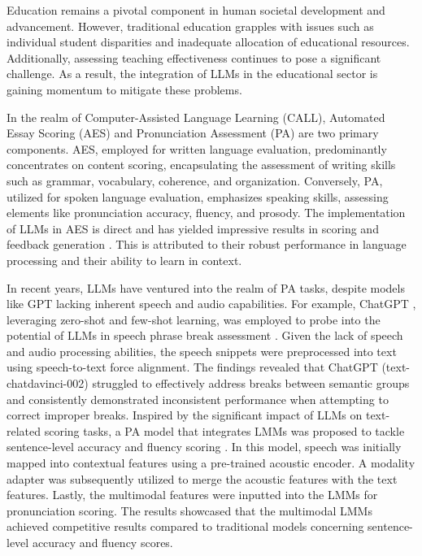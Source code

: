 \documentclass{Interspeech}
\begin{document}
Education remains a pivotal component in human societal development and advancement. However, traditional education grapples with issues such as individual student disparities and inadequate allocation of educational resources. Additionally, assessing teaching effectiveness continues to pose a significant challenge. As a result, the integration of LLMs in the educational sector \cite{gan2023llms} is gaining momentum to mitigate these problems.

In the realm of Computer-Assisted Language Learning (CALL), Automated Essay Scoring (AES) and Pronunciation Assessment (PA) are two primary components. AES, employed for written language evaluation, predominantly concentrates on content scoring, encapsulating the assessment of writing skills such as grammar, vocabulary, coherence, and organization. Conversely, PA, utilized for spoken language evaluation, emphasizes speaking skills, assessing elements like pronunciation accuracy, fluency, and prosody. The implementation of LLMs in AES is direct and has yielded impressive results in scoring and feedback generation \cite{han2023llm,xiao2024human,stahl2024exploring,banno2024gpt4,kim2024is}. This is attributed to their robust performance in language processing and their ability to learn in context.

In recent years, LLMs have ventured into the realm of PA tasks, despite models like GPT lacking inherent speech and audio capabilities. For example, ChatGPT \cite{openai2022chatgpt}, leveraging zero-shot and few-shot learning, was employed to probe into the potential of LLMs in speech phrase break assessment \cite{wang23assessing}. Given the lack of speech and audio processing abilities, the speech snippets were preprocessed into text using speech-to-text force alignment. The findings revealed that ChatGPT (text-chatdavinci-002) struggled to effectively address breaks between semantic groups and consistently demonstrated inconsistent performance when attempting to correct improper breaks. Inspired by the significant impact of LLMs on text-related scoring tasks, a PA model that integrates LMMs was proposed to tackle sentence-level accuracy and fluency scoring \cite{fu2024pronunciation}. In this model, speech was initially mapped into contextual features using a pre-trained acoustic encoder. A modality adapter was subsequently utilized to merge the acoustic features with the text features. Lastly, the multimodal features were inputted into the LMMs for pronunciation scoring. The results showcased that the multimodal LMMs achieved competitive results compared to traditional models concerning sentence-level accuracy and fluency scores.
\end{document}
